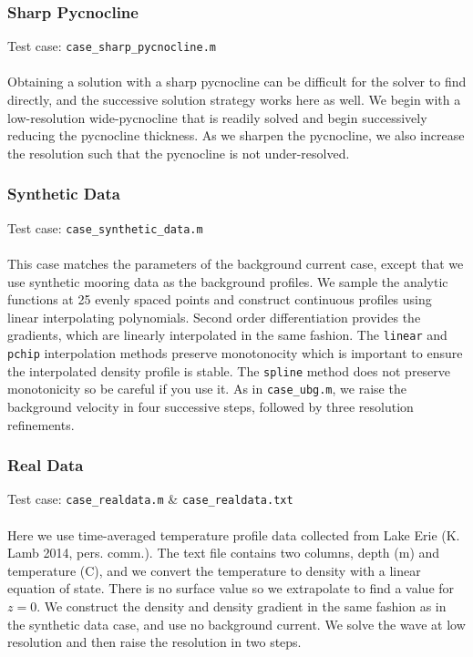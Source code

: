 \documentclass[letterpaper]{article}
\begin{document}
\subsubsection{Sharp Pycnocline}
Test case: \verb"case_sharp_pycnocline.m" \\\\
Obtaining a solution with a sharp pycnocline can be difficult for the solver to find directly, and the successive solution strategy works here as well.
We begin with a low-resolution wide-pycnocline that is readily solved and begin successively reducing the pycnocline thickness.
As we sharpen the pycnocline, we also increase the resolution such that the pycnocline is not under-resolved.

\subsubsection{Synthetic Data}
Test case: \verb"case_synthetic_data.m" \\\\
This case matches the parameters of the background current case, except that we use synthetic mooring data as the background profiles.
We sample the analytic functions at 25 evenly spaced points and construct continuous profiles using linear interpolating polynomials.
Second order differentiation provides the gradients, which are linearly interpolated in the same fashion.
The \verb+linear+ and \verb+pchip+ interpolation methods preserve monotonocity which is important to ensure the interpolated density profile is stable.
The \verb+spline+ method does not preserve monotonicity so be careful if you use it.
As in \verb"case_ubg.m", we raise the background velocity in four successive steps, followed by three resolution refinements.

\subsubsection{Real Data}
Test case: \verb"case_realdata.m" \&  \verb"case_realdata.txt" \\\\
Here we use time-averaged temperature profile data collected from Lake Erie (K. Lamb 2014, pers. comm.). 
The text file contains two columns, depth (m) and temperature (\textdegree C), and we convert the temperature to density with a linear equation of state.
There is no surface value so we extrapolate to find a value for $z=0$.
We construct the density and density gradient in the same fashion as in the synthetic data case, and use no background current.
We solve the wave at low resolution and then raise the resolution in two steps.
\end{document}
